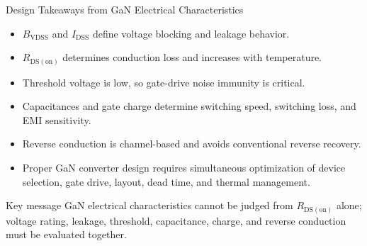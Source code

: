 \begin{frame}{Design Takeaways from GaN Electrical Characteristics}
\begin{itemize}
    \item $B_{\mathrm{VDSS}}$ and $I_{\mathrm{DSS}}$ define voltage blocking and leakage behavior.
    \item $R_{\mathrm{DS(on)}}$ determines conduction loss and increases with temperature.
    \item Threshold voltage is low, so gate-drive noise immunity is critical.
    \item Capacitances and gate charge determine switching speed, switching loss, and EMI sensitivity.
    \item Reverse conduction is channel-based and avoids conventional reverse recovery.
    \item Proper GaN converter design requires simultaneous optimization of device selection, gate drive, layout, dead time, and thermal management.
\end{itemize}

\begin{block}{Key message}
GaN electrical characteristics cannot be judged from $R_{\mathrm{DS(on)}}$ alone; voltage rating, leakage, threshold, capacitance, charge, and reverse conduction must be evaluated together.
\end{block}
\end{frame}